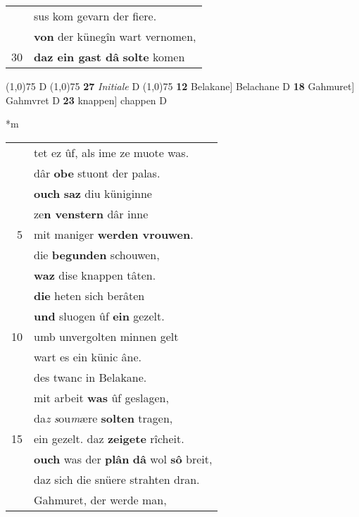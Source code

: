 \documentclass[8pt,a4paper,notitlepage]{article}
\begin{document}
\begin{table}[ht]
\begin{minipage}[t]{0.5\linewidth}
\begin{tabular}{rl}
 & sus kom gevarn der fiere.\\ 
 & \textbf{von} der künegîn wart vernomen,\\ 
30 & \textbf{daz ein gast dâ} \textbf{solte} komen\\ 
\end{tabular}
\scriptsize
\line(1,0){75} \newline
D \newline
\line(1,0){75} \newline
\textbf{27} \textit{Initiale} D  \newline
\line(1,0){75} \newline
\textbf{12} Belakane] Belachane D \textbf{18} Gahmuret] Gahmvret D \textbf{23} knappen] chappen D \newline
\end{minipage}
\hspace{0.5cm}
\begin{minipage}[t]{0.5\linewidth}
\small
\begin{center}*m
\end{center}
\begin{tabular}{rl}
 & tet ez ûf, als ime ze muote was.\\ 
 & dâr \textbf{obe} stuont der palas.\\ 
 & \textbf{ouch} \textbf{saz} diu küniginne\\ 
 & ze\textbf{n venstern} dâr inne\\ 
5 & mit maniger \textbf{werden vrouwen}.\\ 
 & die \textbf{begunden} schouwen,\\ 
 & \textbf{waz} dise knappen tâten.\\ 
 & \textbf{die} heten sich berâten\\ 
 & \textbf{und} sluogen ûf \textbf{ein} gezelt.\\ 
10 & umb unvergolten minnen gelt\\ 
 & wart es ein künic âne.\\ 
 & des twanc in Belakane.\\ 
 & mit arbeit \textbf{was} ûf geslagen,\\ 
 & da\textit{z} \textit{s}ou\textit{m}ære \textbf{solten} tragen,\\ 
15 & ein gezelt. daz \textbf{zeigete} rîcheit.\\ 
 & \textbf{ouch} was der \textbf{plân} \textbf{dâ} wol \textbf{sô} breit,\\ 
 & daz sich die snüere strahten dran.\\ 
 & Gahmuret, der werde man,\\ 

\end{tabular}
\end{minipage}
\end{table}
\end{document}
